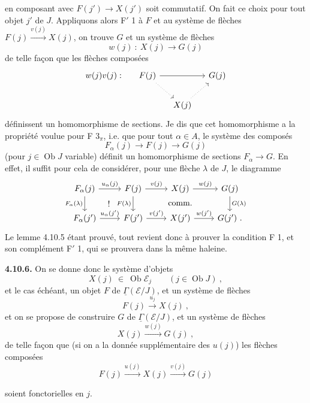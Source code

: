 \documentclass[11pt]{article}
\newcommand{\printedpage}[1]{\marginpar{\footnotesize p.~#1}}
\newcommand{\msp}[1]{\marginpar{\footnotesize [#1]}}
\newcommand{\Ob}{\operatorname{Ob}}
\newcommand{\uGamma}{\underline{\Gamma}}
\begin{document}
\msp{253}
en composant avec $F(j')\longrightarrow X(j')$ soit commutatif. On fait ce choix pour tout objet $j'$ de $J$. Appliquons alors F$'$ 1 à $F$ et au système de flèches $F(j)\xrightarrow{v(j)}X(j)$, on trouve $G$ et un système de flèches
\[
w(j)\ :\ X(j) \longrightarrow G(j)
\]
de telle façon que les flèches composées
\[
\begin{tikzcd}[column sep=small]
w(j)v(j) : & F(j) \arrow[rr] \arrow[dr,dotted] & & G(j) \\
& & X(j) \arrow[ur,dotted] &
\end{tikzcd}
\]
définissent un homomorphisme de sections. Je dis que cet homomorphisme a la propriété voulue pour F $3_\pi$, i.e. que pour tout $\alpha\in A$, le système des composés
\[
F_\alpha(j) \longrightarrow F(j) \longrightarrow G(j)
\]
(pour $j\in\Ob J$ variable) définit un homomorphisme de sections $F_\alpha\longrightarrow G$. En effet, il suffit pour cela de considérer, pour une flèche $\lambda$ de $J$, le
\printedpage{96}
\msp{254}
diagramme
\[
\begin{tikzcd}
F_\alpha(j) \arrow[r,"u_\alpha(j)"] \arrow[d,"F_\alpha(\lambda)"'] \arrow[dr,phantom,"!"] & F(j) \arrow[r,"v(j)"] \arrow[d,"F(\lambda)"'] & X(j) \arrow[r,"w(j)"] \arrow[d,phantom,"\text{comm.}"] & G(j) \arrow[d,"G(\lambda)"] \\
F_\alpha(j') \arrow[r,"u_\alpha(j')"] & F(j') \arrow[r,"v(j')"] & X(j') \arrow[r,"w(j')"] & G(j')\ .
\end{tikzcd}
\]
Le lemme 4.10.5 étant prouvé, tout revient donc à prouver la condition F 1, et son complément F$'$ 1, qui se prouvera dans la même haleine.

\textbf{4.10.6.} On se donne donc le système d'objets
\[
X(j)\ \in\ \Ob\mathcal{E}_j \qquad (j\in\Ob J)\ , \tag*{(4.10.6.1)}
\]
et le cas échéant, un objet $F$ de $\uGamma(\mathcal{E}/J)$, et un système de flèches
\[
F(j) \xrightarrow{u_j} X(j)\ , \tag*{(4.6.10.2)} %
\]
et on se propose de construire $G$ de $\uGamma(\mathcal{E}/J)$, et un système de flèches
\[
X(j) \xrightarrow{w(j)} G(j)\ , \tag*{(4.10.6.3)}
\]
de telle façon que (si on a la donnée supplémentaire des $u(j)$) les flèches composées
\[
F(j) \xrightarrow{u(j)} X(j) \xrightarrow{v(j)} G(j) %
\]

\msp{255}
soient fonctorielles en $j$.
\end{document}
